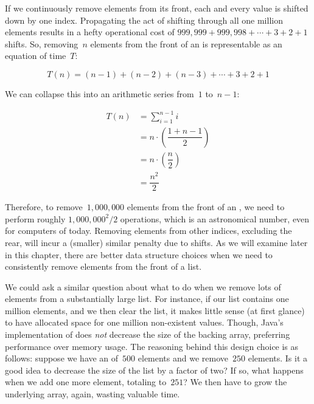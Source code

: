 If we continuously remove elements from its front, each and every value is shifted down by one index. 
Propagating the act of shifting through all one million elements results in a hefty operational cost of $999,999 + 999,998 + \cdots + 3 + 2 + 1$ shifts. 
So, removing~$n$ elements from the front of an  is representable as an equation of time~$T$:

\[
T(n) = (n - 1) + (n - 2) + (n - 3) + \cdots + 3 + 2 + 1
\]

We can collapse this into an arithmetic series from~$1$ to~$n-1$:

\begin{align*}
T(n) &= \sum_{i=1}^{n-1}{i}\\
     &= n\cdot \left(\dfrac{1 + n - 1}{2}\right)\\
     &= n\cdot \left(\dfrac{n}{2}\right)\\
     &= \dfrac{n^2}{2}
\end{align*}

Therefore, to remove~$1,000,000$ elements from the front of an , we need to perform roughly $1,000,000^2/{2}$ operations, which is an astronomical number, even for computers of today.
Removing elements from other indices, excluding the rear, will incur a (smaller) similar penalty due to shifts. 
As we will examine later in this chapter, there are better data structure choices when we need to consistently remove elements from the front of a list.

We could ask a similar question about what to do when we remove lots of elements from a substantially large list. 
For instance, if our list contains one million elements, and we then clear the list, it makes little sense (at first glance) to have allocated space for one million non-existent values.
Though, Java's implementation of  does \emph{not} decrease the size of the backing array, preferring performance over memory usage. 
The reasoning behind this design choice is as follows: suppose we have an  of~$500$ elements and we remove~$250$ elements. 
Is it a good idea to decrease the size of the list by a factor of two? 
If so, what happens when we add one more element, totaling to~$251$? 
We then have to grow the underlying array, again, wasting valuable time.

